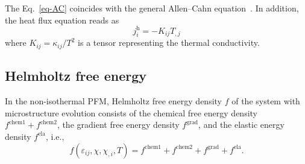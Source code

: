 \documentclass[reprint,3p,sort&compress,times,onecolumn]{elsarticle}
\begin{document}
\begin{itemize}
The Eq.~\ref{eq-AC} coincides with the general Allen--Cahn equation~\cite{allen1979microscopic}. In addition, the heat flux equation reads as
\begin{equation}
j_i^{\text{h}}=-K_{ij} T_{,j} \label{eq-heat-flux}
\end{equation}
where $K_{ij}=\kappa_{ij}/T^2$ is a tensor representing the thermal conductivity.





\end{itemize}


\subsection{Helmholtz free energy}

In the non-isothermal PFM, Helmholtz free energy density $f$ of the system with microstructure evolution consists of the chemical free energy  density $f^{\text{chem1}}+f^{\text{chem2}}$, the gradient free energy  density $f^{\text{grad}}$, and the elastic energy  density $f^{\text{ela}}$, i.e.,
\begin{equation}
f(\varepsilon_{ij},\chi,\chi_{,i},T) = f^{\text{chem1}}+f^{\text{chem2}}+f^{\text{grad}}+f^{\text{ela}}.
\end{equation} \label{eq2}
\end{document}
